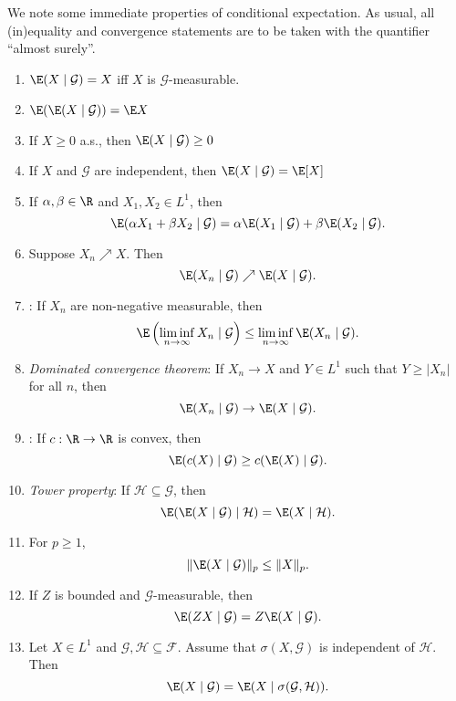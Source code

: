 \documentclass[a4paper]{article}
\begin{document}
We note some immediate properties of conditional expectation. As usual, all (in)equality and convergence statements are to be taken with the quantifier ``almost surely''.
\begin{prop}\leavevmode
  \begin{enumerate}
    \item $\E(X \mid \mathcal{G}) = X$ iff $X$ is $\mathcal{G}$-measurable.
    \item $\E(\E(X \mid \mathcal{G})) = \E X$
    \item If $X \geq 0$ a.s., then $\E(X \mid \mathcal{G}) \geq 0$
    \item If $X$ and $\mathcal{G}$ are independent, then $\E(X \mid \mathcal{G}) = \E[X]$
    \item If $\alpha, \beta \in \R$ and $X_1, X_2 \in L^1$, then
      \[
        \E(\alpha X_1 + \beta X_2 \mid \mathcal{G}) = \alpha \E(X_1 \mid\mathcal{G}) + \beta \E(X_2 \mid \mathcal{G}).
      \]
    \item Suppose $X_n \nearrow X$. Then
      \[
        \E(X_n\mid \mathcal{G}) \nearrow \E(X \mid \mathcal{G}).
      \]
    \item {}: If $X_n$ are non-negative measurable, then
      \[
        \E\left(\liminf_{n \to \infty} X_n \mid \mathcal{G}\right) \leq \liminf_{n \to \infty} \E(X_n \mid \mathcal{G}).
      \]
    \item \emph{Dominated convergence theorem}: If $X_n \to X$ and $Y \in L^1$ such that $Y \geq |X_n|$ for all $n$, then
      \[
        \E(X_n \mid \mathcal{G}) \to \E(X \mid \mathcal{G}).
      \]
    \item {}: If $c: \R \to \R$ is convex, then
      \[
        \E(c(X) \mid \mathcal{G}) \geq c(\E(X) \mid \mathcal{G}).
      \]
    \item \emph{Tower property}: If $\mathcal{H} \subseteq \mathcal{G}$, then
      \[
        \E(\E(X \mid \mathcal{G}) \mid \mathcal{H}) = \E(X \mid \mathcal{H}).
      \]
    \item For $p \geq 1$,
      \[
        \|\E(X \mid \mathcal{G})\|_p \leq \|X\|_p.
      \]
    \item If $Z$ is bounded and $\mathcal{G}$-measurable, then
      \[
        \E(ZX \mid \mathcal{G}) = Z \E(X \mid \mathcal{G}).
      \]
    \item Let $X \in L^1$ and $\mathcal{G}, \mathcal{H} \subseteq \mathcal{F}$. Assume that $\sigma(X, \mathcal{G})$ is independent of $\mathcal{H}$. Then
      \[
        \E (X \mid \mathcal{G}) = \E(X \mid \sigma(\mathcal{G}, \mathcal{H})).
      \]
  \end{enumerate}
\end{prop}
\end{document}
